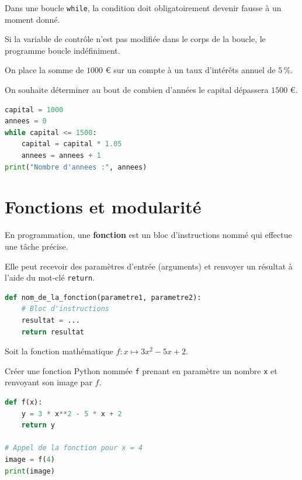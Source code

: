 \begin{attention}
	Dans une boucle \lstinline|while|, la condition doit obligatoirement devenir fausse à un moment donné.

	Si la variable de contrôle n'est pas modifiée dans le corps de la boucle, le programme boucle indéfiniment.
\end{attention}

\begin{methode}
	On place la somme de $1000$ € sur un compte à un taux d'intérêts annuel de $5\,\%$.

	On souhaite déterminer au bout de combien d'années le capital dépassera $1500$ €.

	\begin{correction}
		\nline
		\begin{lstlisting}[language=Python]
capital = 1000
annees = 0
while capital <= 1500:
    capital = capital * 1.05
    annees = annees + 1
print("Nombre d'annees :", annees)
\end{lstlisting}
	\end{correction}
\end{methode}

\section{Fonctions et modularité}

\begin{defin}[Fonction]
	En programmation, une \textbf{fonction} est un bloc d'instructions nommé qui effectue une tâche précise.

	Elle peut recevoir des paramètres d'entrée (arguments) et renvoyer un résultat à l'aide du mot-clé \lstinline|return|.
\end{defin}

\begin{defin}
	\nline
	\begin{lstlisting}[language=Python]
def nom_de_la_fonction(parametre1, parametre2):
    # Bloc d'instructions
    resultat = ...
    return resultat
\end{lstlisting}
\end{defin}

\begin{methode}
	Soit la fonction mathématique $f: x \mapsto 3x^2 - 5x + 2$.

	Créer une fonction Python nommée \lstinline|f| prenant en paramètre un nombre \lstinline|x| et renvoyant son image par $f$.

	\begin{correction}
		\nline
		\begin{lstlisting}[language=Python]
def f(x):
    y = 3 * x**2 - 5 * x + 2
    return y

# Appel de la fonction pour x = 4
image = f(4)
print(image)
\end{lstlisting}
	\end{correction}
\end{methode}

